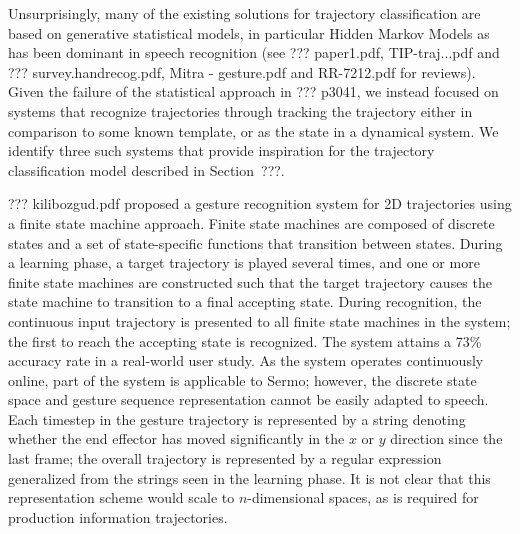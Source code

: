 
Unsurprisingly, many of the existing
solutions for trajectory classification
are based on generative statistical models,
in particular Hidden Markov Models
as has been dominant in speech recognition
(see ??? paper1.pdf, TIP-traj...pdf
and ??? survey.handrecog.pdf,
Mitra - gesture.pdf
and RR-7212.pdf for reviews).
Given the failure of the statistical approach
in ??? p3041,
we instead focused on systems
that recognize trajectories
through tracking the trajectory
either in comparison to some known template,
or as the state in a dynamical system.
We identify three such systems
that provide inspiration
for the trajectory classification model
described in Section~???.

??? kilibozgud.pdf proposed
a gesture recognition system
for 2D trajectories
using a finite state machine approach.
Finite state machines are composed of
discrete states and a set of state-specific
functions that transition between states.
During a learning phase,
a target trajectory is played
several times,
and one or more finite state machines
are constructed such that
the target trajectory
causes the state machine
to transition to a final accepting state.
During recognition,
the continuous input trajectory
is presented to all finite state machines
in the system;
the first to reach the accepting state is recognized.
The system attains a 73\% accuracy rate
in a real-world user study.
As the system operates continuously online,
part of the system is applicable to Sermo;
however, the discrete state space and
gesture sequence representation
cannot be easily adapted to speech.
Each timestep in the gesture trajectory
is represented by a string denoting whether the
end effector has moved significantly
in the $x$ or $y$ direction since the last frame;
the overall trajectory is represented
by a regular expression generalized from
the strings seen in the learning phase.
It is not clear that this representation scheme
would scale to $n$-dimensional spaces,
as is required for production information trajectories.

